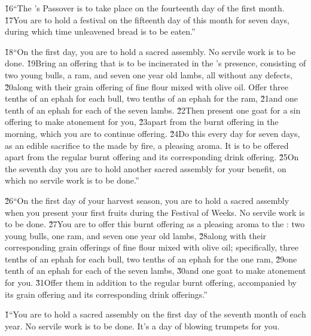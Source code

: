 \v{16}``The 's Passover is to take place on the fourteenth day of the first month. \v{17}You are to hold a festival on the fifteenth day of this month for seven days, during which time unleavened bread is to be eaten.''

\v{18}``On the first day, you are to hold a sacred assembly. No servile work is to be done. \v{19}Bring an offering that is to be incinerated in the 's presence, consisting of two young bulls, a ram, and seven one year old lambs, all without any defects, \v{20}along with their grain offering of fine flour mixed with olive oil. Offer three tenths of an ephah for each bull, two tenths of an ephah for the ram, \v{21}and one tenth of an ephah for each of the seven lambs. \v{22}Then present one goat for a sin offering to make atonement for you, \v{23}apart from the burnt offering in the morning, which you are to continue offering. \v{24}Do this every day for seven days, as an edible sacrifice to the  made by fire, a pleasing aroma. It is to be offered apart from the regular burnt offering and its corresponding drink offering. \v{25}On the seventh day you are to hold another sacred assembly for your benefit, on which no servile work is to be done.''

\v{26}``On the first day of your harvest season, you are to hold a sacred assembly when you present your first fruits during the Festival of Weeks. No servile work is to be done. \v{27}You are to offer this burnt offering as a pleasing aroma to the : two young bulls, one ram, and seven one year old lambs, \v{28}along with their corresponding grain offerings of fine flour mixed with olive oil; specifically, three tenths of an ephah for each bull, two tenths of an ephah for the one ram, \v{29}one tenth of an ephah for each of the seven lambs, \v{30}and one goat to make atonement for you. \v{31}Offer them in addition to the regular burnt offering, accompanied by its grain offering and its corresponding drink offerings.''

\v{1}``You are to hold a sacred assembly on the first day of the seventh month of each year. No servile work is to be done. It's a day of blowing trumpets for you.


